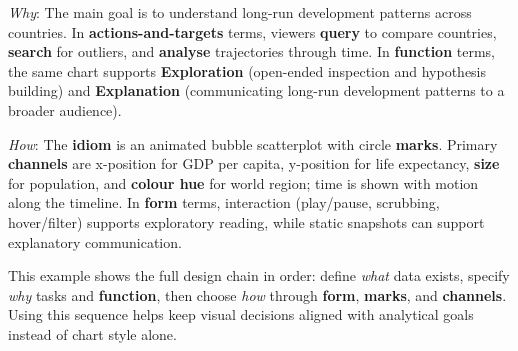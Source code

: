 \textit{Why}: The main goal is to understand long-run development patterns across countries. In \textbf{actions-and-targets} terms, viewers \textbf{query} to compare countries, \textbf{search} for outliers, and \textbf{analyse} trajectories through time. In \textbf{function} terms, the same chart supports \textbf{Exploration} (open-ended inspection and hypothesis building) and \textbf{Explanation} (communicating long-run development patterns to a broader audience).

\textit{How}: The \textbf{idiom} is an animated bubble scatterplot with circle \textbf{marks}. Primary \textbf{channels} are x-position for GDP per capita, y-position for life expectancy, \textbf{size} for population, and \textbf{colour hue} for world region; time is shown with motion along the timeline. In \textbf{form} terms, interaction (play/pause, scrubbing, hover/filter) supports exploratory reading, while static snapshots can support explanatory communication.

This example shows the full design chain in order: define \textit{what} data exists, specify \textit{why} tasks and \textbf{function}, then choose \textit{how} through \textbf{form}, \textbf{marks}, and \textbf{channels}. Using this sequence helps keep visual decisions aligned with analytical goals instead of chart style alone.
